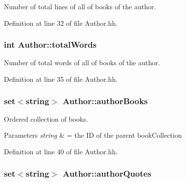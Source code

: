 Number of total lines of all of books of the author. 



Definition at line 32 of file Author.\-hh.

\hypertarget{class_author_a478c72fff965eb1ee8fcaddfe173715b}{
\subsubsection[{total\-Words}]{\setlength{\rightskip}{0pt plus 5cm}int Author\-::total\-Words\hspace{0.3cm}{\ttfamily [private]}}}\label{class_author_a478c72fff965eb1ee8fcaddfe173715b}


Number of total words of all of books of the author. 



Definition at line 35 of file Author.\-hh.

\hypertarget{class_author_ad9ffe450cdafed2242936f6fcafa22b4}{
\subsubsection[{author\-Books}]{\setlength{\rightskip}{0pt plus 5cm}set$<$string$>$ Author\-::author\-Books\hspace{0.3cm}{\ttfamily [private]}}}\label{class_author_ad9ffe450cdafed2242936f6fcafa22b4}


Ordered collection of books. 


\begin{DoxyParams}{Parameters}
{\em string} & = the I\-D of the parent book\-Collection \\
\hline
\end{DoxyParams}


Definition at line 40 of file Author.\-hh.

\hypertarget{class_author_ad505d991f439d28c4831828952e01fb6}{
\subsubsection[{author\-Quotes}]{\setlength{\rightskip}{0pt plus 5cm}set$<$string$>$ Author\-::author\-Quotes\hspace{0.3cm}{\ttfamily [private]}}}\label{class_author_ad505d991f439d28c4831828952e01fb6}


